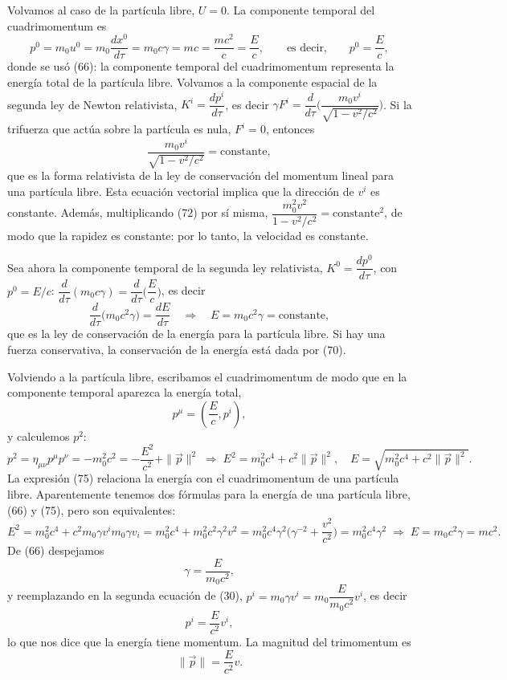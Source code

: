 Volvamos al caso de la partícula libre, $U=0$. La componente temporal del
cuadrimomentum es
\[
p^0 = m_0u^0 = m_0\frac{dx^0}{d\tau} = m_0c\gamma = mc = \frac{mc^2}{c} =
\frac Ec, \qquad\text{es decir,}\qquad p^0 = \frac Ec , \tag{71}
\]
donde se usó (66): la componente temporal del cuadrimomentum representa
la energía total de la partícula libre. Volvamos a la componente espacial
de la segunda ley de Newton relativista, $K^i=\dfrac{dp^i}{d\tau}$, es
decir $\gamma F^i=\dfrac{d}{d\tau}\Big(\dfrac{m_0v^i}{\sqrt{1-v^2/c^2}}
\Big)$. Si la trifuerza que actúa sobre la partícula es nula, $F^i=0$,
entonces
\[
\frac{m_0v^i}{\sqrt{1-v^2/c^2}} = \text{constante}, \tag{72}
\]
que es la forma relativista de la ley de conservación del momentum lineal
para una partícula libre. Esta ecuación vectorial implica que la
dirección de $v^i$ es constante. Además, multiplicando (72) por sí misma,
$\dfrac{m_0^2v^2}{1-v^2/c^2}=\text{constante}^2$, de modo que la rapidez
es constante: por lo tanto, la velocidad es constante.

Sea ahora la componente temporal de la segunda ley relativista,
$K^0=\dfrac{dp^0}{d\tau}$, con $p^0=E/c$: $\dfrac{d}{d\tau}(m_0c\gamma)=
\dfrac{d}{d\tau}\Big(\dfrac Ec\Big)$, es decir
\[
\frac{d}{d\tau}\big(m_0c^2\gamma\big) = \frac{dE}{d\tau}\quad\Longrightarrow
\quad E=m_0c^2\gamma=\text{constante}, \tag{73}
\]
que es la ley de conservación de la energía para la partícula libre. Si
hay una fuerza conservativa, la conservación de la energía está dada por
(70).

Volviendo a la partícula libre, escribamos el cuadrimomentum de modo que
en la componente temporal aparezca la energía total,
\[
p^\mu = \left(\frac Ec,p^i\right), \tag{74}
\]
y calculemos $p^2$:
\[
p^2 = \eta_{\mu\nu}p^\mu p^\nu = -m_0^2c^2 = -\frac{E^2}{c^2}+\|\vec
p\|^2 \;\Longrightarrow\; E^2 = m_0^2c^4+c^2\|\vec p\|^2, \quad
E=\sqrt{m_0^2c^4+c^2\|\vec p\|^2}. \tag{75}
\]
La expresión (75) relaciona la energía con el cuadrimomentum de una
partícula libre. Aparentemente tenemos dos fórmulas para la energía de
una partícula libre, (66) y (75), pero son equivalentes:
\[
E^2 = m_0^2c^4+c^2m_0\gamma v^im_0\gamma v_i = m_0^2c^4+m_0^2c^2\gamma^2
v^2 = m_0^2c^4\gamma^2\Big(\gamma^{-2}+\frac{v^2}{c^2}\Big) =
m_0^2c^4\gamma^2 \;\Rightarrow\; E=m_0c^2\gamma=mc^2 .
\]
De (66) despejamos
\[
\gamma = \frac{E}{m_0c^2}, \tag{76}
\]
y reemplazando en la segunda ecuación de (30), $p^i=m_0\gamma v^i=
m_0\dfrac{E}{m_0c^2}v^i$, es decir
\[
p^i = \frac{E}{c^2}v^i , \tag{77}
\]
lo que nos dice que la energía tiene momentum. La magnitud del
trimomentum es
\[
\|\vec p\| = \frac{E}{c^2}v . \tag{78}
\]

